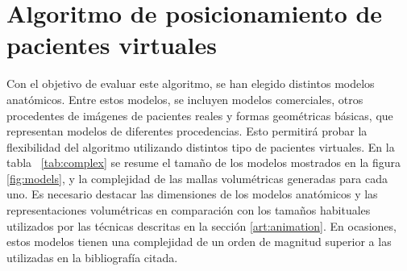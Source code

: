 \section{Algoritmo de posicionamiento de pacientes virtuales} 
\label{posing:result}


Con el objetivo de evaluar este algoritmo, se han elegido distintos modelos anatómicos.
Entre estos modelos, se incluyen modelos comerciales, otros procedentes de imágenes de pacientes reales 
y formas geométricas básicas, que representan modelos de diferentes procedencias. Esto permitirá probar la flexibilidad del algoritmo utilizando distintos tipo de pacientes virtuales.
En la tabla ~\ref{tab:complex} se resume el tamaño de los modelos mostrados en la figura \ref{fig:models}, y la complejidad de las mallas volumétricas generadas para cada uno. Es necesario destacar las dimensiones de los modelos anatómicos y las representaciones volumétricas en comparación con los tamaños habituales 
utilizados por las técnicas descritas en la sección \ref{art:animation}. 
En ocasiones, estos modelos tienen una complejidad de un orden de magnitud superior a las utilizadas en la bibliografía citada.

